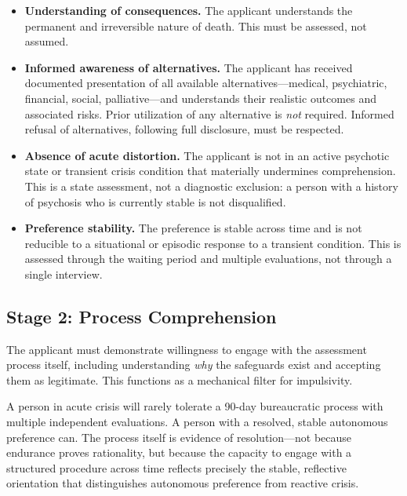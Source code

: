 \documentclass[11pt, letterpaper]{article}
\begin{document}
\begin{itemize}
  \item \textbf{Understanding of consequences.} The applicant understands the permanent and
    irreversible nature of death. This must be assessed, not assumed.

  \item \textbf{Informed awareness of alternatives.} The applicant has received documented
    presentation of all available alternatives---medical, psychiatric, financial, social,
    palliative---and understands their realistic outcomes and associated risks. Prior
    utilization of any alternative is \emph{not} required. Informed refusal of alternatives,
    following full disclosure, must be respected.

  \item \textbf{Absence of acute distortion.} The applicant is not in an active psychotic
    state or transient crisis condition that materially undermines comprehension. This is a
    state assessment, not a diagnostic exclusion: a person with a history of psychosis who
    is currently stable is not disqualified.

  \item \textbf{Preference stability.} The preference is stable across time and is not
    reducible to a situational or episodic response to a transient condition. This is assessed
    through the waiting period and multiple evaluations, not through a single interview.
\end{itemize}

\subsection{Stage 2: Process Comprehension}

The applicant must demonstrate willingness to engage with the assessment process itself,
including understanding \emph{why} the safeguards exist and accepting them as legitimate.
This functions as a mechanical filter for impulsivity.

A person in acute crisis will rarely tolerate a 90-day bureaucratic process with
multiple independent evaluations. A person with a resolved, stable autonomous preference can.
The process itself is evidence of resolution---not because endurance proves rationality, but
because the capacity to engage with a structured procedure across time reflects precisely
the stable, reflective orientation that distinguishes autonomous preference from reactive crisis.
\end{document}
